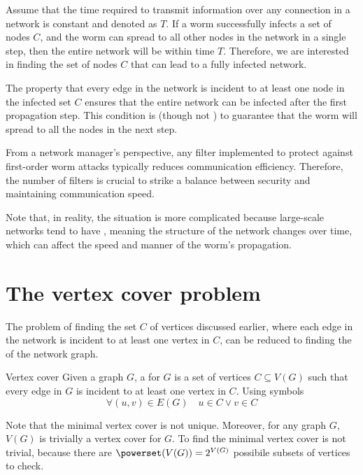 \documentclass[a4paper, 12pt]{report}
\begin{document}
    Assume that the time required to transmit information over any connection in a network is constant and denoted as $T$. If a worm successfully infects a set of nodes $C$, and the worm can spread to all other nodes in the network in a single step, then the entire network will be  within time $T$. Therefore, we are interested in finding the set of nodes $C$ that can lead to a fully infected network.

    The property that every edge in the network is incident to at least one node in the infected set $C$ ensures that the entire network can be infected after the first propagation step. This condition is  (though not ) to guarantee that the worm will spread to all the nodes in the next step.

    From a network manager's perspective, any filter implemented to protect against first-order worm attacks typically reduces communication efficiency. Therefore,  the number of filters is crucial to strike a balance between security and maintaining communication speed.

    Note that, in reality, the situation is more complicated because large-scale networks tend to have , meaning the structure of the network changes over time, which can affect the speed and manner of the worm's propagation.

    \section{The vertex cover problem}

    The problem of finding the set $C$ of vertices discussed earlier, where each edge in the network is incident to at least one vertex in $C$, can be reduced to finding the  of the network graph.
    
    \begin{frameddefn}{Vertex cover}
        Given a graph $G$, a  for $G$ is a set of vertices $C \subseteq V(G)$ such that every edge in $G$ is incident to at least one vertex in $C$. Using symbols $$\forall (u, v) \in E(G) \quad u \in C \lor v \in C$$
    \end{frameddefn}

    Note that the minimal vertex cover is not unique. Moreover, for any graph $G$, $V(G)$ is trivially a vertex cover for $G$. To find the minimal vertex cover is not trivial, because there are $\powerset(V(G)) = 2^{V(G)}$ possibile subsets of vertices to check.
    
\end{document}
